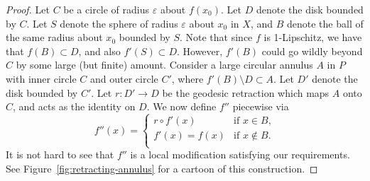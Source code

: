 \documentclass[11pt,a4paper]{amsart}
\theoremstyle{definition}
\begin{document}
\begin{proof}
    Let $C$ be a circle of radius $\varepsilon$ about $f(x_0)$. Let $D$ denote the disk bounded by $C$. Let $S$ denote the sphere of radius $\varepsilon$ about $x_0$ in $X$, and $B$ denote the ball of the same radius about $x_0$ bounded by $S$.
    Note that since $f$ is 1-Lipschitz, we have that $f(B) \subset D$, and also $f'(S) \subset D$. However, $f'(B)$ could go wildly beyond $C$ by some large (but finite) amount. Consider a large circular annulus $A$ in $P$ with inner circle $C$ and outer circle $C'$, where $f'(B) \setminus D \subset A$. Let $D'$ denote the disk bounded by $C'$. Let $r : D' \to D$ be the geodesic retraction which maps $A$ onto $C$, and acts as the identity on $D$. We now define $f''$ piecewise via
    $$
        f''(x) =
        \begin{cases}
        r \circ f'(x) &\text{if $x \in B$,}\\
        f'(x) = f(x)  &\text{if $x \not\in B$.}\\
        \end{cases}
    $$
    It is not hard to see that $f''$ is a local modification satisfying our requirements. See Figure~\ref{fig:retracting-annulus} for a cartoon of this construction.
\end{proof}
\end{document}
